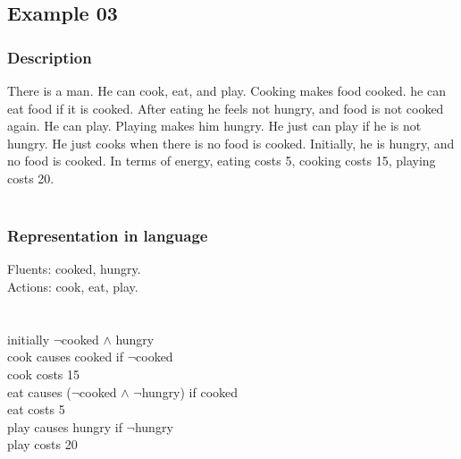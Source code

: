 \documentclass[11pt]{article}
\begin{document}
	\subsection{Example 03}
	\subsubsection{Description}\label{par:p103}
	There is a man. He can cook, eat, and play. Cooking makes food cooked. he can eat food if it is cooked. After eating he feels not hungry, and food is not cooked again. He can play. Playing makes him hungry. He just can play if he is not hungry. He just cooks when there is no food is cooked. Initially, he is hungry, and no food is cooked. In terms of energy, eating costs 5, cooking costs 15, playing costs 20.\\
	\\
	\subsubsection{Representation in language}\label{par:p203}
	Fluents: cooked, hungry.\\
	Actions: cook, eat, play.\\
	\\
	\\
	initially $\neg$cooked $\land$ hungry\\
	cook causes cooked if $\neg$cooked\\
	cook costs 15\\
	eat causes ($\neg$cooked $\land$ $\neg$hungry) if cooked\\
	eat costs 5\\
	play causes hungry if $\neg$hungry\\
	play costs 20\\
	\\
\end{document}
